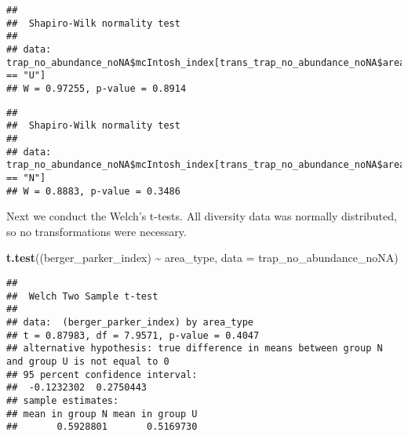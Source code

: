 \documentclass[
]{article}
\newenvironment{Shaded}{\begin{snugshade}}{\end{snugshade}}
\newcommand{\AttributeTok}[1]{\textcolor[rgb]{0.13,0.29,0.53}{#1}}
\newcommand{\FunctionTok}[1]{\textcolor[rgb]{0.13,0.29,0.53}{\textbf{#1}}}
\newcommand{\NormalTok}[1]{#1}
\newcommand{\SpecialCharTok}[1]{\textcolor[rgb]{0.81,0.36,0.00}{\textbf{#1}}}
\newcommand{\StringTok}[1]{\textcolor[rgb]{0.31,0.60,0.02}{#1}}
\begin{document}
\begin{Shaded}
\end{Shaded}

\begin{verbatim}
## 
##  Shapiro-Wilk normality test
## 
## data:  trap_no_abundance_noNA$mcIntosh_index[trans_trap_no_abundance_noNA$area_type == "U"]
## W = 0.97255, p-value = 0.8914
\end{verbatim}

\begin{Shaded}
\end{Shaded}

\begin{verbatim}
## 
##  Shapiro-Wilk normality test
## 
## data:  trap_no_abundance_noNA$mcIntosh_index[trans_trap_no_abundance_noNA$area_type == "N"]
## W = 0.8883, p-value = 0.3486
\end{verbatim}

Next we conduct the Welch's t-tests. All diversity data was normally
distributed, so no transformations were necessary.

\begin{Shaded}
\begin{Highlighting}[]
\FunctionTok{t.test}\NormalTok{((berger\_parker\_index) }\SpecialCharTok{\textasciitilde{}}\NormalTok{ area\_type, }\AttributeTok{data =}\NormalTok{ trap\_no\_abundance\_noNA)}
\end{Highlighting}
\end{Shaded}

\begin{verbatim}
## 
##  Welch Two Sample t-test
## 
## data:  (berger_parker_index) by area_type
## t = 0.87983, df = 7.9571, p-value = 0.4047
## alternative hypothesis: true difference in means between group N and group U is not equal to 0
## 95 percent confidence interval:
##  -0.1232302  0.2750443
## sample estimates:
## mean in group N mean in group U 
##       0.5928801       0.5169730
\end{verbatim}
\end{document}

